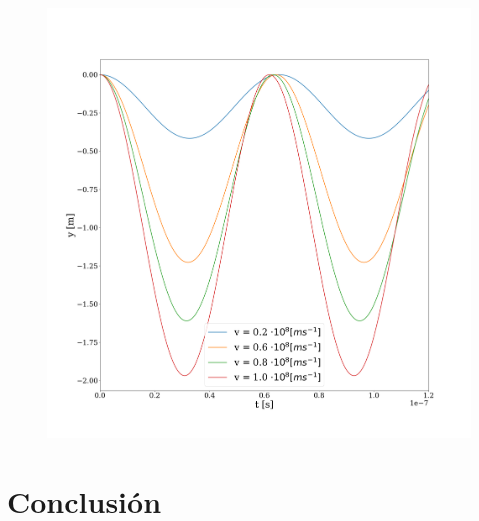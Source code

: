 \documentclass[journal]{IEEEtran}
\begin{document}
\begin{figure}
    \centering
    \includegraphics[width=\linewidth]{freq_relativista_relativistas.png}
\end{figure}

\clearpage

\section{Conclusión}
\label{sec:conclusion}
\end{document}
